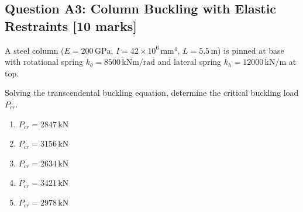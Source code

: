 \documentclass[12pt,a4paper]{article}
\begin{document}
\begin{questionbox}
\subsection*{Question A3: Column Buckling with Elastic Restraints [10 marks]}
A steel column ($E = 200\,\text{GPa}$, $I = 42\times10^6\,\text{mm}^4$, $L = 5.5\,\text{m}$) 
is pinned at base with rotational spring $k_\theta = 8500\,\text{kNm/rad}$ and lateral spring 
$k_h = 12000\,\text{kN/m}$ at top.

\begin{center}
\end{center}

Solving the transcendental buckling equation, determine the critical buckling load $P_{cr}$.

\begin{mcqbox}
\begin{enumerate}[label=(\Alph*),leftmargin=*]
    \item $P_{cr} = 2847\,\text{kN}$
    \item $P_{cr} = 3156\,\text{kN}$
    \item $P_{cr} = 2634\,\text{kN}$
    \item $P_{cr} = 3421\,\text{kN}$
    \item $P_{cr} = 2978\,\text{kN}$
\end{enumerate}
\end{mcqbox}
\end{questionbox}
\end{document}
